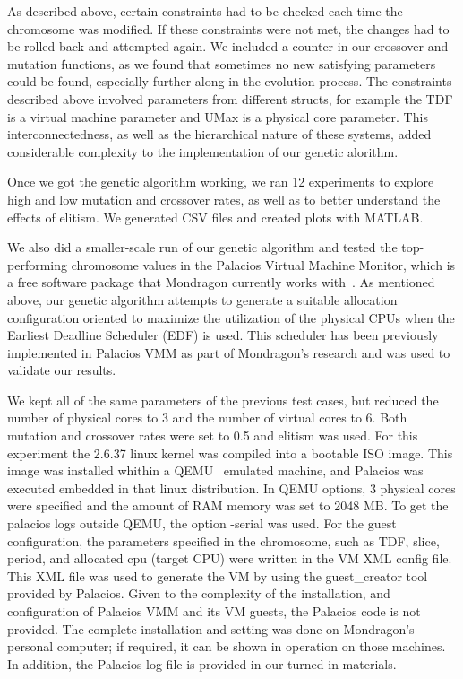 \documentclass[11pt]{article}
\begin{document}
As described above, certain constraints had to be checked each time the chromosome was modified. If these constraints were not met, the changes had to be rolled back and attempted again. We included a counter in our crossover and mutation functions, as we found that sometimes no new satisfying parameters could be found, especially further along in the evolution process. The constraints described above involved parameters from different structs, for example the TDF is a virtual machine parameter and UMax is a physical core parameter. This interconnectedness, as well as the hierarchical nature of these systems, added considerable complexity to the implementation of our genetic alorithm. 

Once we got the genetic algorithm working, we ran 12 experiments to explore high and low mutation and crossover rates, as well as to better understand the effects of elitism. We generated CSV files and created plots with MATLAB. 

We also did a smaller-scale run of our genetic algorithm and tested the top-performing chromosome values in the Palacios Virtual Machine Monitor, which is a free software package that Mondragon currently works with~\cite{Mondragon:13}. As mentioned above, our genetic algorithm attempts to generate a suitable allocation configuration oriented to maximize the utilization of the physical CPUs when the Earliest Deadline Scheduler (EDF) is used. This scheduler has been previously implemented in Palacios VMM as part of Mondragon's research and was used to validate our results.

We kept all of the same parameters of the previous test cases, but reduced the number of physical cores to 3 and the number of virtual cores to 6. Both mutation and crossover rates were set to 0.5 and elitism was used. For this experiment the 2.6.37 linux kernel was compiled into a bootable ISO image. This image was installed whithin a QEMU~\cite{Bellard:2005} emulated machine, and Palacios was executed embedded in that linux distribution. In QEMU options, 3 physical cores were specified and the amount of RAM memory was set to 2048 MB. To get the palacios logs outside QEMU, the option -serial was used. For the guest configuration, the parameters specified in the chromosome, such as TDF, slice, period, and allocated cpu (target CPU) were written in the VM XML config file. This XML file was used to generate the VM by using the guest\_creator tool provided by Palacios. Given to the complexity of the installation, and configuration of Palacios VMM and its VM guests, the Palacios code is not provided. The complete installation and setting was done on Mondragon's personal computer; if required, it can be shown in operation on those machines. In addition, the Palacios log file is provided in our turned in materials.
\end{document}
